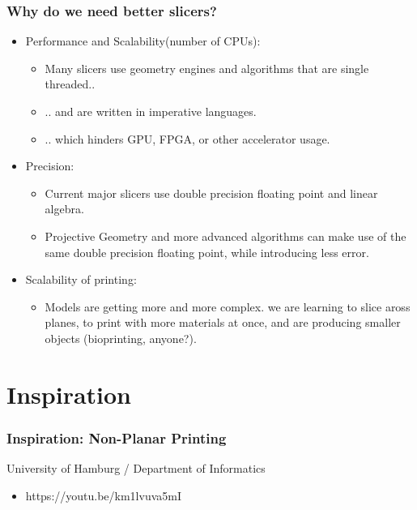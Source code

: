 \documentclass[hyperref={pdfpagemode=FullScreen},aspectratio=169]{beamer}
\begin{document}
\begin{frame}
  \frametitle{Why do we need better slicers?}
  \begin{itemize}
  \item Performance and Scalability(number of CPUs):
    \begin{itemize}
    \item Many slicers use geometry engines and algorithms that are single threaded..
    \item .. and are written in imperative languages.
    \item .. which hinders GPU, FPGA, or other accelerator usage.
    \end{itemize}
  \item Precision:
    \begin{itemize}
    \item Current major slicers use double precision floating point and linear algebra.
    \item Projective Geometry and more advanced algorithms can make use of the same double precision floating point, while introducing less error.
    \end{itemize}
  \item Scalability of printing:
    \begin{itemize}
    \item Models are getting more and more complex. we are learning to slice aross planes, to print with more materials at once, and are producing smaller objects (bioprinting, anyone?).
    \end{itemize}
  \end{itemize}
\end{frame}

\section{Inspiration}
\begin{frame}
  \frametitle{Inspiration: Non-Planar Printing}
  \begin{block}{University of Hamburg / Department of Informatics}
    \begin{itemize}
    \item https://youtu.be/km1lvuva5mI
    \end{itemize}
  \end{block}
\end{frame}
\end{document}
